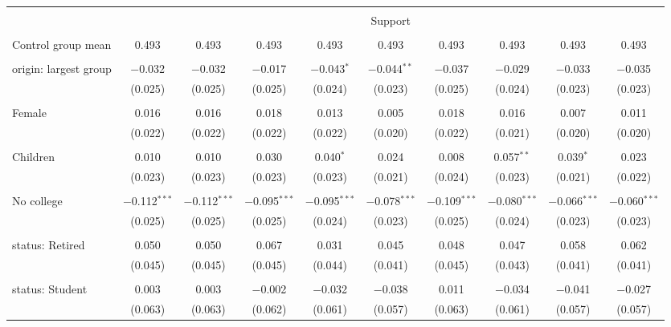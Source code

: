 
\begin{tabular}{@{\extracolsep{5pt}}lccccccccc} 
\\[-1.8ex]\hline 
\hline \\[-1.8ex] 
 & \multicolumn{9}{c}{Support} \\ 
\cline{2-10} 
\hline \\[-1.8ex] 
 Control group mean & 0.493 & 0.493 & 0.493 & 0.493 & 0.493 & 0.493 & 0.493 & 0.493 & 0.493  \\ \hline \\[-1.8ex] origin: largest group & $-$0.032 & $-$0.032 & $-$0.017 & $-$0.043$^{*}$ & $-$0.044$^{**}$ & $-$0.037 & $-$0.029 & $-$0.033 & $-$0.035 \\ 
  & (0.025) & (0.025) & (0.025) & (0.024) & (0.023) & (0.025) & (0.024) & (0.023) & (0.023) \\ 
  & & & & & & & & & \\ 
 Female & 0.016 & 0.016 & 0.018 & 0.013 & 0.005 & 0.018 & 0.016 & 0.007 & 0.011 \\ 
  & (0.022) & (0.022) & (0.022) & (0.022) & (0.020) & (0.022) & (0.021) & (0.020) & (0.020) \\ 
  & & & & & & & & & \\ 
 Children & 0.010 & 0.010 & 0.030 & 0.040$^{*}$ & 0.024 & 0.008 & 0.057$^{**}$ & 0.039$^{*}$ & 0.023 \\ 
  & (0.023) & (0.023) & (0.023) & (0.023) & (0.021) & (0.024) & (0.023) & (0.021) & (0.022) \\ 
  & & & & & & & & & \\ 
 No college & $-$0.112$^{***}$ & $-$0.112$^{***}$ & $-$0.095$^{***}$ & $-$0.095$^{***}$ & $-$0.078$^{***}$ & $-$0.109$^{***}$ & $-$0.080$^{***}$ & $-$0.066$^{***}$ & $-$0.060$^{***}$ \\ 
  & (0.025) & (0.025) & (0.025) & (0.024) & (0.023) & (0.025) & (0.024) & (0.023) & (0.023) \\ 
  & & & & & & & & & \\ 
 status: Retired & 0.050 & 0.050 & 0.067 & 0.031 & 0.045 & 0.048 & 0.047 & 0.058 & 0.062 \\ 
  & (0.045) & (0.045) & (0.045) & (0.044) & (0.041) & (0.045) & (0.043) & (0.041) & (0.041) \\ 
  & & & & & & & & & \\ 
 status: Student & 0.003 & 0.003 & $-$0.002 & $-$0.032 & $-$0.038 & 0.011 & $-$0.034 & $-$0.041 & $-$0.027 \\ 
  & (0.063) & (0.063) & (0.062) & (0.061) & (0.057) & (0.063) & (0.061) & (0.057) & (0.057) \\ 

\end{tabular}
